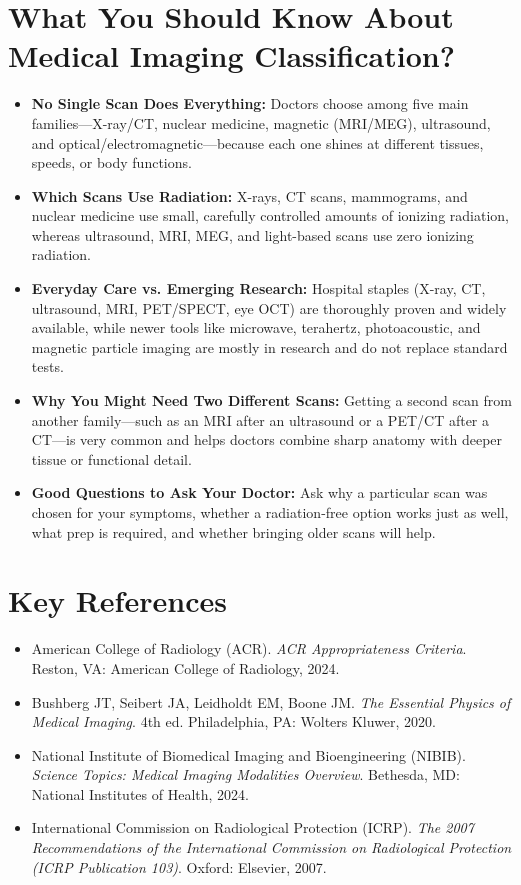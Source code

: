 \section{What You Should Know About Medical Imaging Classification?}
\begin{itemize}
  \item \textbf{No Single Scan Does Everything:} Doctors choose among five main families---X-ray/CT, nuclear medicine, magnetic (MRI/MEG), ultrasound, and optical/electromagnetic---because each one shines at different tissues, speeds, or body functions.
  \item \textbf{Which Scans Use Radiation:} X-rays, CT scans, mammograms, and nuclear medicine use small, carefully controlled amounts of ionizing radiation, whereas ultrasound, MRI, MEG, and light-based scans use zero ionizing radiation.
  \item \textbf{Everyday Care vs. Emerging Research:} Hospital staples (X-ray, CT, ultrasound, MRI, PET/SPECT, eye OCT) are thoroughly proven and widely available, while newer tools like microwave, terahertz, photoacoustic, and magnetic particle imaging are mostly in research and do not replace standard tests.
  \item \textbf{Why You Might Need Two Different Scans:} Getting a second scan from another family---such as an MRI after an ultrasound or a PET/CT after a CT---is very common and helps doctors combine sharp anatomy with deeper tissue or functional detail.
  \item \textbf{Good Questions to Ask Your Doctor:} Ask why a particular scan was chosen for your symptoms, whether a radiation-free option works just as well, what prep is required, and whether bringing older scans will help.
\end{itemize}

\section{Key References}
\begin{itemize}
  \item American College of Radiology (ACR). \emph{ACR Appropriateness Criteria}. Reston, VA: American College of Radiology, 2024.
  \item Bushberg JT, Seibert JA, Leidholdt EM, Boone JM. \emph{The Essential Physics of Medical Imaging}. 4th ed. Philadelphia, PA: Wolters Kluwer, 2020.
  \item National Institute of Biomedical Imaging and Bioengineering (NIBIB). \emph{Science Topics: Medical Imaging Modalities Overview}. Bethesda, MD: National Institutes of Health, 2024.
  \item International Commission on Radiological Protection (ICRP). \emph{The 2007 Recommendations of the International Commission on Radiological Protection (ICRP Publication 103)}. Oxford: Elsevier, 2007.
\end{itemize}
